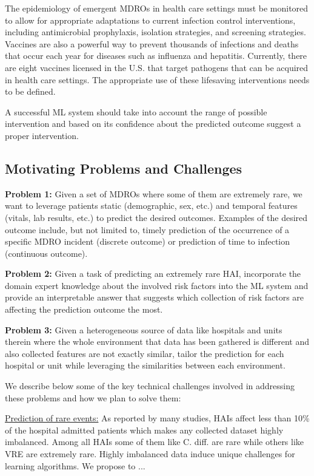 The epidemiology of emergent MDROs in health care settings must be monitored to allow for appropriate adaptations to current infection control interventions, including antimicrobial prophylaxis, isolation strategies, and screening strategies. Vaccines are also a powerful way to prevent thousands of infections and deaths that occur each year for diseases such as influenza and hepatitis. Currently, there are eight vaccines licensed in the U.S. that target pathogens that can be acquired in health care settings. The appropriate use of these lifesaving interventions needs to be defined.

A successful ML system should take into account the range of possible intervention and based on its confidence about the predicted outcome suggest a proper intervention.


\subsection{Motivating Problems and Challenges}
{\noindent \bf Problem 1:} Given a set of MDROs where some of them are extremely rare, we want to leverage patients static (demographic, sex, etc.) and temporal features (vitals, lab results, etc.) to predict the desired outcomes. Examples of the desired outcome include, but not limited to, timely prediction of the occurrence of a specific MDRO incident (discrete outcome) or prediction of time to infection (continuous outcome).

{\noindent \bf Problem 2:} Given a task of predicting an extremely rare HAI, incorporate the domain expert knowledge about the involved risk factors into the ML system and provide an interpretable answer that suggests which collection of risk factors are affecting the prediction outcome the most.

{\noindent \bf Problem 3:} Given a heterogeneous source of data like hospitals and units therein where the whole environment that data has been gathered is different and also collected features are not exactly similar, tailor the prediction for each hospital or unit while leveraging the similarities between each environment.

We describe below some of the key technical challenges involved in addressing these problems and how we plan to solve them:

\underline{Prediction of rare events:} As reported by many studies, HAIs affect less than 10\% of the hospital admitted patients which makes any collected dataset highly imbalanced. Among all HAIs some of them like C. diff. are rare while others like VRE are extremely rare. Highly imbalanced data induce unique challenges for learning algorithms. We propose to ...

